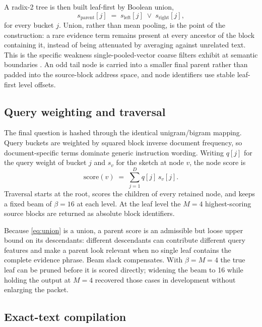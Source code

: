 \documentclass[conference]{IEEEtran}
\begin{document}
A radix-2 tree is then built leaf-first by Boolean union,
\begin{equation}
s_{\text{parent}}[j] \;=\; s_{\text{left}}[j] \;\vee\; s_{\text{right}}[j],
\label{eq:union}
\end{equation}
for every bucket $j$. Union, rather than mean pooling, is the point of the
construction: a rare evidence term remains present at every ancestor of the block
containing it, instead of being attenuated by averaging against unrelated text. This
is the specific weakness single-pooled-vector coarse filters exhibit at semantic
boundaries \cite{hisa}. An odd tail node is carried into a smaller final parent rather
than padded into the source-block address space, and node identifiers use stable
leaf-first level offsets.

\subsection{Query weighting and traversal}

The final question is hashed through the identical unigram/bigram mapping. Query
buckets are weighted by squared block inverse document frequency, so
document-specific terms dominate generic instruction wording. Writing $q[j]$ for
the query weight of bucket $j$ and $s_v$ for the sketch at node $v$, the node
score is
\begin{equation}
\mathrm{score}(v) \;=\; \sum_{j=1}^{D} q[j]\, s_v[j].
\label{eq:score}
\end{equation}
Traversal starts at the root, scores the children of every retained node, and keeps
a fixed beam of $\beta=16$ at each level. At the leaf level the $M=4$
highest-scoring source blocks are returned as absolute block identifiers.

Because \eqref{eq:union} is a union, a parent score is an admissible but loose upper
bound on its descendants: different descendants can contribute different query
features and make a parent look relevant when no single leaf contains the complete
evidence phrase. Beam slack compensates. With $\beta=M=4$ the true leaf can be
pruned before it is scored directly; widening the beam to 16 while holding the
output at $M=4$ recovered those cases in development without enlarging the packet.

\subsection{Exact-text compilation}
\end{document}
